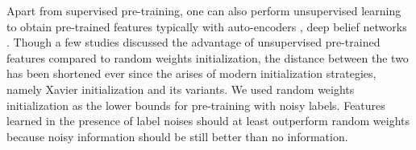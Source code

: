 


Apart from supervised pre-training, one can also perform unsupervised learning to obtain pre-trained features typically with auto-encoders \cite{vincent2010stacked,masci2011stacked}, deep belief networks \cite{hinton2006fast,lee2009convolutional}.
Though a few studies \cite{erhan2009difficulty,erhan2010does,bengio2012deep} discussed the advantage of unsupervised pre-trained features compared to random weights initialization, the distance between the two has been shortened ever since the arises of modern initialization strategies, namely Xavier initialization \cite{glorot2010understanding} and its variants.
We used random weights initialization as the lower bounds for pre-training with noisy labels.
Features learned in the presence of label noises should at least outperform random weights because noisy information should be still better than no information.

